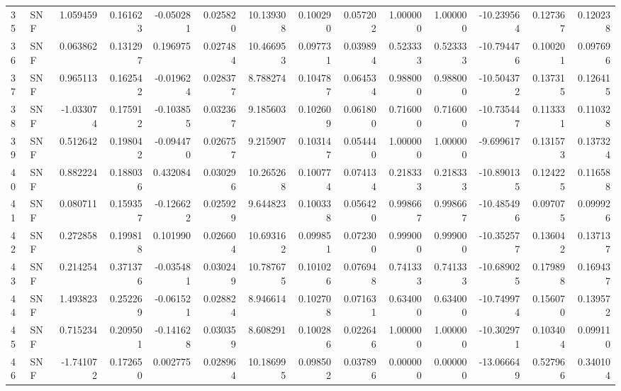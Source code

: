 \begin{tabular}{llrrrrrrrrrrrr}
35  &    SNF &  1.059459 &      0.161623 & -0.050281 &    0.025820 &  10.139308 &      0.100290 &   0.057202 &  1.000000 &  1.000000 & -10.239564 &     0.127367 &     0.120238 \\
36  &    SNF &  0.063862 &      0.131297 &  0.196975 &    0.027484 &  10.466953 &      0.097731 &   0.039894 &  0.523333 &  0.523333 & -10.794476 &     0.100201 &     0.097696 \\
37  &    SNF &  0.965113 &      0.162542 & -0.019624 &    0.028377 &   8.788274 &      0.104787 &   0.064534 &  0.988000 &  0.988000 & -10.504372 &     0.137315 &     0.126415 \\
38  &    SNF & -1.033074 &      0.175912 & -0.103855 &    0.032367 &   9.185603 &      0.102609 &   0.061800 &  0.716000 &  0.716000 & -10.735447 &     0.113331 &     0.110328 \\
39  &    SNF &  0.512642 &      0.198042 & -0.094470 &    0.026757 &   9.215907 &      0.103147 &   0.054440 &  1.000000 &  1.000000 &  -9.699617 &     0.131573 &     0.137324 \\
40  &    SNF &  0.882224 &      0.188036 &  0.432084 &    0.030296 &  10.265268 &      0.100774 &   0.074134 &  0.218333 &  0.218333 & -10.890135 &     0.124225 &     0.116588 \\
41  &    SNF &  0.080711 &      0.159357 & -0.126622 &    0.025929 &   9.644823 &      0.100338 &   0.056420 &  0.998667 &  0.998667 & -10.485496 &     0.097075 &     0.099926 \\
42  &    SNF &  0.272858 &      0.199818 &  0.101990 &    0.026604 &  10.693162 &      0.099851 &   0.072300 &  0.999000 &  0.999000 & -10.352577 &     0.136042 &     0.137137 \\
43  &    SNF &  0.214254 &      0.371376 & -0.035481 &    0.030249 &  10.787675 &      0.101026 &   0.076948 &  0.741333 &  0.741333 & -10.689025 &     0.179898 &     0.169437 \\
44  &    SNF &  1.493823 &      0.252269 & -0.061521 &    0.028824 &   8.946614 &      0.102708 &   0.071631 &  0.634000 &  0.634000 & -10.749974 &     0.156070 &     0.139572 \\
45  &    SNF &  0.715234 &      0.209501 & -0.141628 &    0.030359 &   8.608291 &      0.100286 &   0.022646 &  1.000000 &  1.000000 & -10.302971 &     0.103404 &     0.099110 \\
46  &    SNF & -1.741072 &      0.172650 &  0.002775 &    0.028964 &  10.186995 &      0.098502 &   0.037896 &  0.000000 &  0.000000 & -13.066649 &     0.527966 &     0.340104 \\

\end{tabular}

